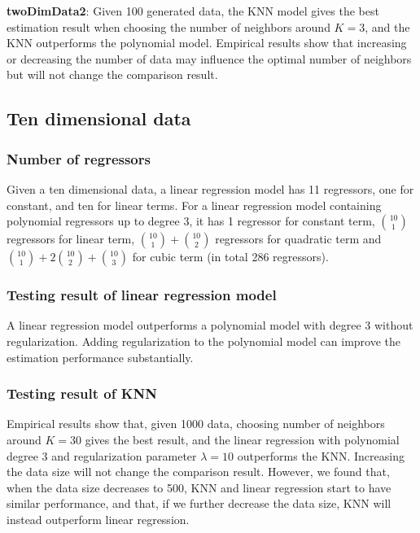 \documentclass[]{article}
\begin{document}
\textbf{twoDimData2}: Given 100 generated data, the KNN model gives the best estimation result when choosing the number of neighbors around $K=3$, and the KNN outperforms the polynomial model. Empirical results show that increasing or decreasing the number of data may influence the optimal number of neighbors but will not change the comparison result.

\subsection{Ten dimensional data} 

\subsubsection{Number of regressors}
Given a ten dimensional data, a linear regression model has 11 regressors, one for constant, and ten for linear terms. For a linear regression model containing polynomial regressors up to degree 3, it has 1 regressor for constant term, ${10}\choose{1}$ regressors for linear term, ${{10}\choose{1}}+{{10}\choose{2}}$ regressors for quadratic term and ${{10}\choose{1}}+2{{10}\choose{2}}+{{10}\choose{3}}$ for cubic term (in total 286 regressors). 

\subsubsection{Testing result of linear regression model}
A linear regression model outperforms a polynomial model with degree 3 without regularization. Adding regularization to the polynomial model can improve the estimation performance substantially. 

\subsubsection{Testing result of KNN}

Empirical results show that, given 1000 data, choosing number of neighbors around $K=30$ gives the best result, and the linear regression with polynomial degree 3 and regularization parameter $\lambda=10$ outperforms the KNN. Increasing the data size will not change the comparison result. However, we found that, when the data size decreases to 500, KNN and linear regression start to have similar performance, and that, if we further decrease the data size, KNN will instead outperform linear regression.
\end{document}

